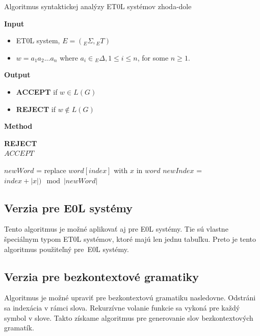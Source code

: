 \begin{algorithm}
\caption{Algoritmus syntaktickej analýzy ET0L systémov zhoda-dole}
\label{topDownET0L}

\textbf{Input}
\begin{itemize}[noitemsep]
    \item ET0L system, \(E = ({}_E\Sigma, {}_ET)\)
    \item \(w = a_1a_2...a_n\)  where  \(a_i \in {}_E\Delta, 1 \leq i \leq n \), for some \(n \geq 1\).
\end{itemize}
\textbf{Output} 
\begin{itemize}[noitemsep]
    \item \textbf{ACCEPT} if \(w \in L(G)\)
    \item \textbf{REJECT} if \(w\notin L(G)\)
\end{itemize}
\textbf{Method}
\begin{algorithmic}
    \State {}
\EndFor

\State \textbf{REJECT}
\\
    \State $ACCEPT$
\EndIf

    \State \Return
\EndIf

    \State $newWord$ = replace $word[index]$ with $x$ in $word$
    \State $newIndex$ = $index + |x|) \mod |newWord|$
            \State {}
        \EndFor
        \State {}
    \EndIf
\EndFor
\EndFunction
    
\end{algorithmic}
\end{algorithm}

\subsection*{Verzia pre E0L systémy}
Tento algoritmus je možné aplikovať aj pre E0L systémy. Tie sú vlastne špeciálnym typom ET0L systémov, ktoré majú len jednu tabuľku. Preto je tento algoritmus použiteľný pre~E0L systémy.

\subsection*{Verzia pre bezkontextové gramatiky}
Algoritmus je možné upraviť pre bezkontextovú gramatiku nasledovne. Odstráni sa indexácia v rámci slova. Rekurzívne volanie funkcie sa vykoná pre každý symbol v slove. Takto získame algoritmus pre generovanie slov bezkontextových gramatík.

